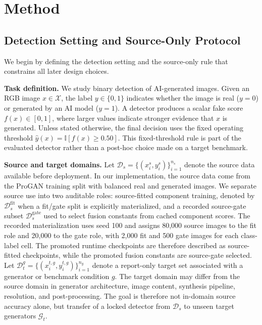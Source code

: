 \documentclass[lettersize,journal]{IEEEtran}
\begin{document}
\section{Method}
\label{sec:method}

\subsection{Detection Setting and Source-Only Protocol}
\label{sec:problem_formulation}

We begin by defining the detection setting and the source-only rule that constrains all later design choices.

\textbf{Task definition.}
We study binary detection of AI-generated images. Given an RGB image $x \in \mathcal{X}$, the label $y \in \{0,1\}$ indicates whether the image is real ($y=0$) or generated by an AI model ($y=1$). A detector produces a scalar fake score $f(x) \in [0,1]$, where larger values indicate stronger evidence that $x$ is generated. Unless stated otherwise, the final decision uses the fixed operating threshold $\hat{y}(x)=\mathbb{I}\left[f(x)\geq0.50\right]$. This fixed-threshold rule is part of the evaluated detector rather than a post-hoc choice made on a target benchmark.

\textbf{Source and target domains.}
Let $\mathcal{D}_{s}=\{(x_i^s,y_i^s)\}_{i=1}^{n_s}$ denote the source data available before deployment. In our implementation, the source data come from the ProGAN training split with balanced real and generated images. We separate source use into two auditable roles: source-fitted component training, denoted by $\mathcal{D}_{s}^{\mathrm{fit}}$ when a fit/gate split is explicitly materialized, and a recorded source-gate subset $\mathcal{D}_{s}^{\mathrm{gate}}$ used to select fusion constants from cached component scores. The recorded materialization uses seed 100 and assigns 80,000 source images to the fit role and 20,000 to the gate role, with 2,000 fit and 500 gate images for each class-label cell. The promoted runtime checkpoints are therefore described as source-fitted checkpoints, while the promoted fusion constants are source-gate selected. Let $\mathcal{D}_{t}^{g}=\{(x_i^{t,g},y_i^{t,g})\}_{i=1}^{n_g}$ denote a report-only target set associated with a generator or benchmark condition $g$. The target domain may differ from the source domain in generator architecture, image content, synthesis pipeline, resolution, and post-processing. The goal is therefore not in-domain source accuracy alone, but transfer of a locked detector from $\mathcal{D}_{s}$ to unseen target generators $\mathcal{G}_{t}$.
\end{document}
